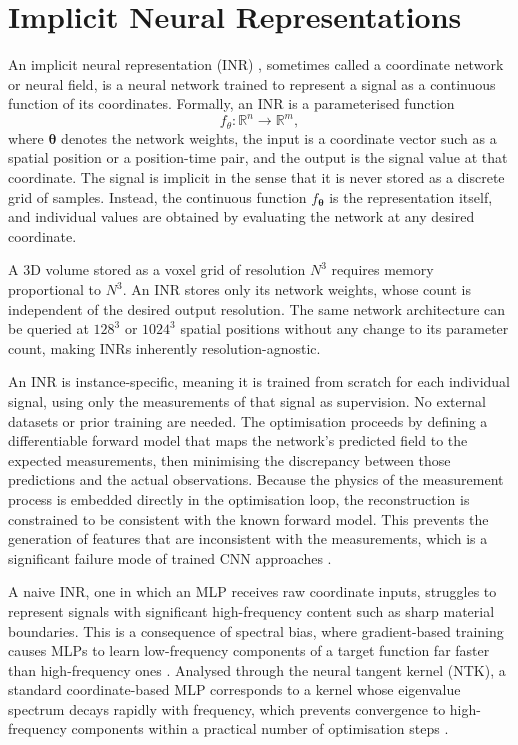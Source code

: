\documentclass[12pt, a4paper, twoside]{report}
\begin{document}
\section{Implicit Neural Representations}
\label{subsec:inr}

An implicit neural representation (INR) \citep{sitzmann2020siren}, sometimes called a coordinate network or neural field, is a neural network trained to represent a signal as a continuous function of its coordinates. Formally, an INR is a parameterised function
%
\begin{equation}
    f_\theta : \mathbb{R}^n \longrightarrow \mathbb{R}^m,
    \label{eq:inr_def}
\end{equation}
%
where $\boldsymbol{\theta}$ denotes the network weights, the input is a coordinate vector such as a spatial position or a position-time pair, and the output is the signal value at that coordinate. The signal is implicit in the sense that it is never stored as a discrete grid of samples. Instead, the continuous function $f_{\boldsymbol{\theta}}$ is the representation itself, and individual values are obtained by evaluating the network at any desired coordinate.

A 3D volume stored as a voxel grid of resolution $N^3$ requires memory proportional to $N^3$. An INR stores only its network weights, whose count is independent of the desired output resolution. The same network architecture can be queried at $128^3$ or $1024^3$ spatial positions without any change to its parameter count, making INRs inherently resolution-agnostic.

An INR is instance-specific, meaning it is trained from scratch for each individual signal, using only the measurements of that signal as supervision. No external datasets or prior training are needed. The optimisation proceeds by defining a differentiable forward model that maps the network's predicted field to the expected measurements, then minimising the discrepancy between those predictions and the actual observations. Because the physics of the measurement process is embedded directly in the optimisation loop, the reconstruction is constrained to be consistent with the known forward model. This prevents the generation of features that are inconsistent with the measurements, which is a significant failure mode of trained CNN approaches \citep{patwari2023hallucination}.

A naive INR, one in which an MLP receives raw coordinate inputs, struggles to represent signals with significant high-frequency content such as sharp material boundaries. This is a consequence of spectral bias, where gradient-based training causes MLPs to learn low-frequency components of a target function far faster than high-frequency ones \citep{rahaman2019spectral}. Analysed through the neural tangent kernel (NTK), a standard coordinate-based MLP corresponds to a kernel whose eigenvalue spectrum decays rapidly with frequency, which prevents convergence to high-frequency components within a practical number of optimisation steps \citep{tancik2020fourier}.
\end{document}
